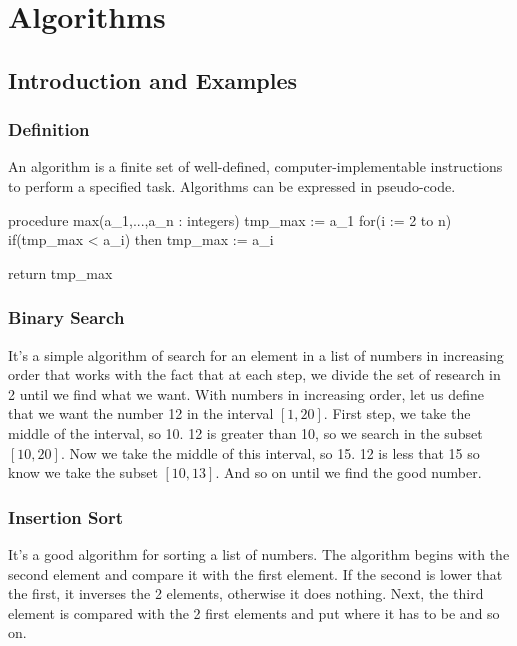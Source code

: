 \documentclass{article}
\begin{document}

\newpage
\section{Algorithms}
\subsection{Introduction and Examples}
\subsubsection{Definition} An algorithm is a finite set of well-defined, computer-implementable instructions to perform a specified task. Algorithms can be expressed in pseudo-code.
\begin{mylisting}
	procedure max(a_1,...,a_n : integers)
		tmp_max := a_1
		for(i := 2 to n)
			if(tmp_max < a_i) then tmp_max := a_i
			
		return tmp_max
\end{mylisting}

\subsubsection{Binary Search} It's a simple algorithm of search for an element in a list of numbers in increasing order that works with the fact that at each step, we divide the set of research in 2 until we find what we want. With numbers in increasing order, let us define that we want the number 12 in the interval $ [1,20] $. First step, we take the middle of the interval, so 10. 12 is greater than 10, so we search in the subset $ [10,20] $. Now we take the middle of this interval, so 15. 12 is less that 15 so know we take the subset $ [10,13] $. And so on until we find the good number.

\subsubsection{Insertion Sort} It's a good algorithm for sorting a list of numbers. The algorithm begins with the second element and compare it with the first element. If the second is lower that the first, it inverses the 2 elements, otherwise it does nothing. Next, the third element is compared with the 2 first elements and put where it has to be and so on.
\end{document}
